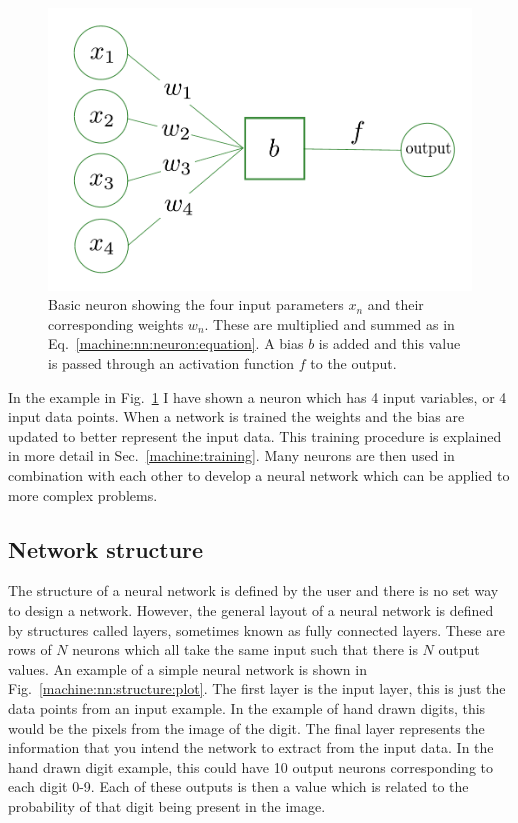 \begin{figure}[ht]
    \centering
    \includegraphics[width=0.6\columnwidth]{C4_cnn/neuron.pdf}
    \caption[Basic neuron]{Basic neuron showing the four input parameters $x_n$ and their corresponding weights $w_n$. These are multiplied and summed as in Eq.~\ref{machine:nn:neuron:equation}. A bias $b$ is added and this value is passed through an activation function $f$ to the output.}
    \label{machine:nn:neuron:plot}
\end{figure}

In the example in Fig.~\ref{machine:nn:neuron:plot} I have shown a neuron which has 4 input variables, or 4 input data points. 
When a network is trained the weights and the bias are updated to better represent the input data.
This training procedure is explained in more detail in Sec.~\ref{machine:training}.
Many neurons are then used in combination with each other to develop a neural network which can be applied to more complex problems.

\subsection{\label{machine:nn:structure}Network structure}

The structure of a neural network is defined by the user and there is no set way to design a network.
However, the general layout of a neural network is defined by structures called layers, sometimes known as fully connected layers. 
These are rows of $N$ neurons which all take the same input such that there is $N$ output values.
An example of a simple neural network is shown in Fig.~\ref{machine:nn:structure:plot}.
The first layer is the input layer, this is just the data points from an input example.
In the example of hand drawn digits, this would be the pixels from the image of the digit.
The final layer represents the information that you intend the network to extract from the input data. 
In the hand drawn digit example, this could have 10 output neurons corresponding to each digit 0-9. 
Each of these outputs is then a value which is related to the probability of that digit being present in the image.  

